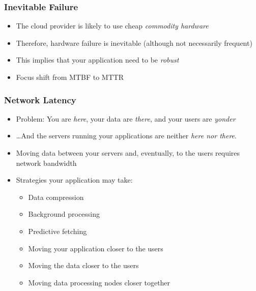 \documentclass[10pt]{beamer}
\begin{document}
\begin{frame}[t]
\frametitle{Inevitable Failure}
\begin{itemize}
\item The cloud provider is likely to use cheap \emph{commodity hardware}
\item Therefore, hardware failure is inevitable (although not necessarily frequent)
\item This implies that your application need to be \emph{robust}
\item Focus shift from MTBF to MTTR
\end{itemize}
\end{frame}

\begin{frame}[t]
\frametitle{Network Latency}
\begin{itemize}
\item Problem: You are \emph{here}, your data are \emph{there}, and your users are \emph{yonder}
\item \ldots And the servers running your applications are neither \emph{here nor there}.
\item Moving data between your servers and, eventually, to the users requires network bandwidth
\item Strategies your application may take:
\begin{itemize}
\item Data compression
\item Background processing
\item Predictive fetching
\item Moving your application closer to the users
\item Moving the data closer to the users
\item Moving data processing nodes closer together
\end{itemize}
\end{itemize}
\end{frame}
\end{document}
